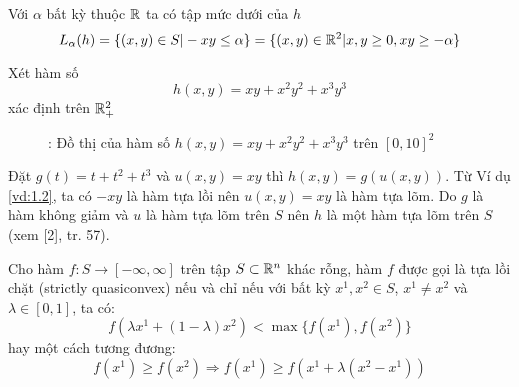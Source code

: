 Với $\alpha$ bất kỳ thuộc $\mathbb{R}$ ta có tập mức dưới của $h$
\begin{equation*}
    L_\alpha(h) = \{(x, y) \in S | -xy \leq \alpha \} = \{(x, y) \in \mathbb{R}^2| x, y \geq 0, xy \geq -\alpha\}
\end{equation*}

\begin{vd}
    Xét hàm số
    \begin{equation*}
        h(x, y) = xy + x^2y^2 + x^3y^3
    \end{equation*}
    xác định trên $\mathbb{R}^2_+$
\end{vd}
\begin{figure}[h!]
    \centering
    \caption{: Đồ thị của hàm số $ h(x, y) = xy + x^2y^2 + x^3y^3$ trên $[0, 10]^2$}
    \label{fig:vd1.3}
\end{figure}
Đặt $g(t) = t + t^2 + t^3$ và $u(x, y) = xy$ thì $ h(x, y) = g(u(x, y))$. Từ Ví dụ \ref{vd:1.2}, ta có $-xy$ là hàm tựa lồi nên $u(x, y) = xy$ là hàm tựa
lõm. Do $g$ là hàm không giảm và $u$ là hàm tựa lõm trên $S$ nên $h$ là một
hàm tựa lõm trên $S$ (xem [2], tr. 57).

\begin{dn}
     Cho hàm $f: S \rightarrow [-\infty, \infty]$ trên tập $S \subset \mathbb{R} ^n$ khác rỗng, hàm $f$ được gọi là tựa lồi chặt (strictly quasiconvex) nếu và chỉ nếu với bất kỳ $x^1, x^2 \in S$, $x^1 \neq x^2$ và $\lambda \in [0,1]$, ta có:
     \begin{equation*}
         f(\lambda x^1 + (1 - \lambda)x^2) < \max \{f(x^1), f(x^2)\}
     \end{equation*}
     hay một cách tương đương:
     \begin{equation*}
          f(x^1) \geq f(x^2) \Rightarrow f(x^1) \geq f(x^1 + \lambda(x^2 - x^1))
     \end{equation*}
\end{dn}

